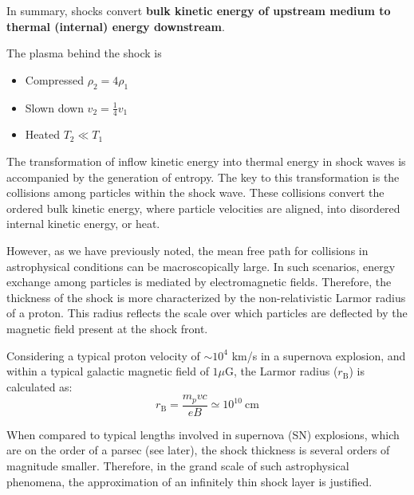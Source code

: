 In summary, shocks convert \textbf{bulk kinetic energy of upstream medium to thermal (internal) energy downstream}.

\begin{remark}
The plasma behind the shock is
\begin{itemize}
\item Compressed \( \rho_2 = 4 \rho_1 \)
\item Slown down \( v_2 = \frac{1}{4} v_1 \)
\item Heated \( T_2 \ll T_1 \)
\end{itemize}
\end{remark}

The transformation of inflow kinetic energy into thermal energy in shock waves is accompanied by the generation of entropy. The key to this transformation is the collisions among particles within the shock wave. These collisions convert the ordered bulk kinetic energy, where particle velocities are aligned, into disordered internal kinetic energy, or heat.

However, as we have previously noted, the mean free path for collisions in astrophysical conditions can be macroscopically large. In such scenarios, energy exchange among particles is mediated by electromagnetic fields.
%
Therefore, the thickness of the shock is more characterized by the non-relativistic Larmor radius of a proton. This radius reflects the scale over which particles are deflected by the magnetic field present at the shock front.

Considering a typical proton velocity of \( \sim 10^4 \) km/s in a supernova explosion, and within a typical galactic magnetic field of \( 1 \mu \)G, the Larmor radius (\( r_{\text{B}} \)) is calculated as:
%
\begin{equation}
r_{\text{B}} = \frac{m_p v c}{e B} \simeq 10^{10}~\text{cm}
\end{equation}

When compared to typical lengths involved in supernova (SN) explosions, which are on the order of a parsec (see later), the shock thickness is several orders of magnitude smaller. Therefore, in the grand scale of such astrophysical phenomena, the approximation of an infinitely thin shock layer is justified.

